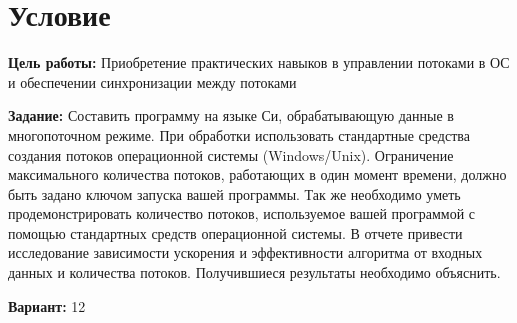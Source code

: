 \section{Условие}
{\bfseries Цель работы:}
Приобретение практических навыков в управлении потоками в ОС и обеспечении синхронизации между потоками

{\bfseries Задание:}
Составить программу на языке Си, обрабатывающую данные в многопоточном режиме. При обработки использовать стандартные средства создания потоков операционной системы (Windows/Unix). 
Ограничение максимального количества потоков, работающих в один момент времени, должно быть задано ключом запуска вашей программы.
Так же необходимо уметь продемонстрировать количество потоков, используемое вашей программой с помощью стандартных средств операционной системы.
В отчете привести исследование зависимости ускорения и эффективности алгоритма от входных данных и количества потоков.
Получившиеся результаты необходимо объяснить.


{\bfseries Вариант:} 12